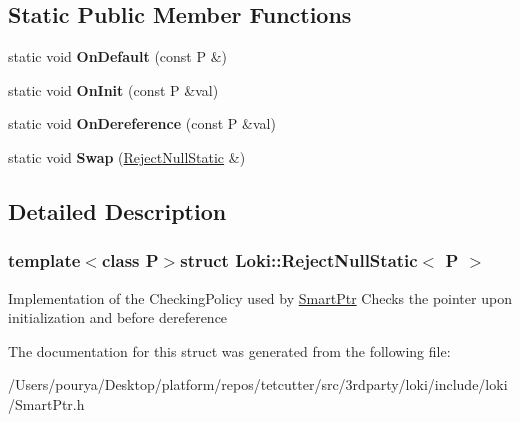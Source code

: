 \subsection*{Static Public Member Functions}
\begin{DoxyCompactItemize}
\item 
\hypertarget{structLoki_1_1RejectNullStatic_a251eebb4c1c6c3c70af24e2d58644616}{}static void {\bfseries On\+Default} (const P \&)\label{structLoki_1_1RejectNullStatic_a251eebb4c1c6c3c70af24e2d58644616}

\item 
\hypertarget{structLoki_1_1RejectNullStatic_aec3ec4e1a0d687e4a525a70b5c8c6ce4}{}static void {\bfseries On\+Init} (const P \&val)\label{structLoki_1_1RejectNullStatic_aec3ec4e1a0d687e4a525a70b5c8c6ce4}

\item 
\hypertarget{structLoki_1_1RejectNullStatic_a4fd7ba7d1a3afa9f6539891d124febca}{}static void {\bfseries On\+Dereference} (const P \&val)\label{structLoki_1_1RejectNullStatic_a4fd7ba7d1a3afa9f6539891d124febca}

\item 
\hypertarget{structLoki_1_1RejectNullStatic_a3a3a244362fdcdfca7ac45639d6c60a4}{}static void {\bfseries Swap} (\hyperlink{structLoki_1_1RejectNullStatic}{Reject\+Null\+Static} \&)\label{structLoki_1_1RejectNullStatic_a3a3a244362fdcdfca7ac45639d6c60a4}

\end{DoxyCompactItemize}


\subsection{Detailed Description}
\subsubsection*{template$<$class P$>$struct Loki\+::\+Reject\+Null\+Static$<$ P $>$}

Implementation of the Checking\+Policy used by \hyperlink{classLoki_1_1SmartPtr}{Smart\+Ptr} Checks the pointer upon initialization and before dereference 

The documentation for this struct was generated from the following file\+:\begin{DoxyCompactItemize}
\item 
/\+Users/pourya/\+Desktop/platform/repos/tetcutter/src/3rdparty/loki/include/loki/Smart\+Ptr.\+h\end{DoxyCompactItemize}
